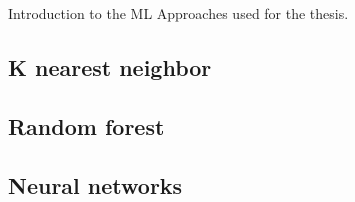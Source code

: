 Introduction to the ML Approaches used for the thesis.

\subsection{K nearest neighbor}
\label{cha:knn}
\subsection{Random forest}
\label{cha:rf}
\subsection{Neural networks}
\label{cha:nn}